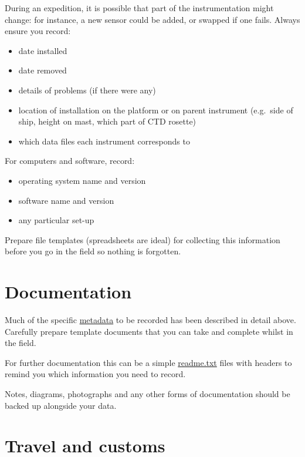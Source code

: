 \documentclass[a4paper,oneside]{report}
\providecommand{\tightlist}{%
  \setlength{\itemsep}{0pt}\setlength{\parskip}{0pt}}
\begin{document}
During an expedition, it is possible that part of the instrumentation
might change: for instance, a new sensor could be added, or swapped if
one fails. Always ensure you record:

\begin{itemize}
\tightlist
\item
  date installed
\item
  date removed
\item
  details of problems (if there were any)
\item
  location of installation on the platform or on parent instrument
  (e.g.~side of ship, height on mast, which part of CTD rosette)
\item
  which data files each instrument corresponds to
\end{itemize}

For computers and software, record:

\begin{itemize}
\tightlist
\item
  operating system name and version
\item
  software name and version
\item
  any particular set-up
\end{itemize}

Prepare file templates (spreadsheets are ideal) for collecting this
information before you go in the field so nothing is forgotten.

\hypertarget{documentation}{%
\section{Documentation}\label{documentation}}

Much of the specific \protect\hyperlink{metadata}{metadata} to be
recorded has been described in detail above. Carefully prepare template
documents that you can take and complete whilst in the field.

For further documentation this can be a simple
\protect\hyperlink{readmetxt}{readme.txt} files with headers to remind
you which information you need to record.

Notes, diagrams, photographs and any other forms of documentation should
be backed up alongside your data.

\hypertarget{travel-and-customs}{%
\section{Travel and customs}\label{travel-and-customs}}
\end{document}
